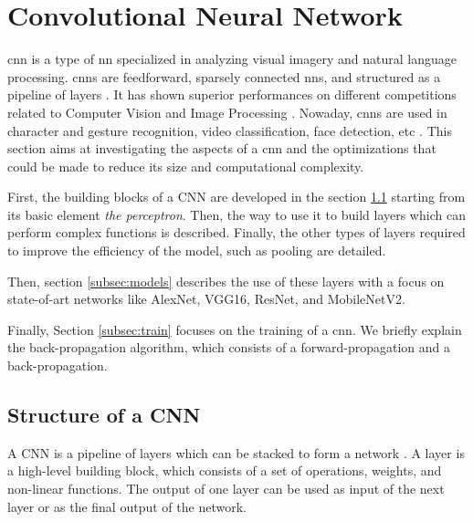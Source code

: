 \section{Convolutional Neural Network} \label{sec:cnn}
\acrshort{cnn} is a type of \acrshort{nn} specialized in analyzing visual imagery and natural language processing. \acrshort{cnn}s are feedforward, sparsely connected \acrshort{nn}s, and structured as a pipeline of layers \cite{abdelouahab_accelerating_2018}. It has shown superior performances on different competitions related to Computer Vision and Image Processing \cite{khan_survey_2020}. Nowaday, \acrshort{cnn}s are used in character and gesture recognition, video classification, face detection, etc \cite{shawahna_fpga-based_2019}. This section aims at investigating the aspects of a \acrshort{cnn} and the optimizations that could be made to reduce its size and computational complexity.

First, the building blocks of a CNN are developed in the section \ref{subsec:layer} starting from its basic element \textit{the perceptron}. Then, the way to use it to build layers which can perform complex functions is described. Finally, the other types of layers required to improve the efficiency of the model, such as pooling are detailed.

Then, section \ref{subsec:models} describes the use of these layers with a focus on state-of-art networks like AlexNet, VGG16, ResNet, and MobileNetV2.

Finally, Section \ref{subsec:train} focuses on the training of a \acrshort{cnn}. We briefly explain the back-propagation algorithm, which consists of a forward-propagation and a back-propagation.
%
%
\subsection{Structure of a CNN} \label{subsec:layer}
%
A CNN is a pipeline of layers which can be stacked to form a network \cite{abdelouahab_accelerating_2018}. A layer is a high-level building block, which consists of a set of operations, weights, and non-linear functions. The output of one layer can be used as input of the next layer or as the final output of the network. 

